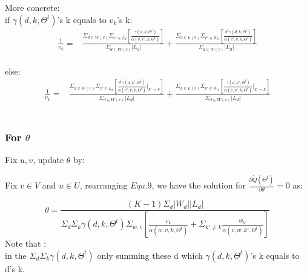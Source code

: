 \documentclass{article}
\begin{document}
More concrete:\\
if $\gamma(d,k,\Theta^t)$'s k equals to $v_k $'s k:
\begin{equation*}
\begin{aligned}
\frac{1}{v_k}= &\frac{\Sigma_{d\in W(v)}\Sigma_{v'\in L_d} [\frac{\gamma(d,k,\Theta^t)}{ \alpha(v,v',k,\Theta^t)} ]}{\Sigma_{d\in W(v)}|L_d|}+ \frac{\Sigma_{d\in L(v)}\Sigma_{v'\in W_d} [\frac{\theta^t \gamma(d,k,\Theta^t)}{\alpha(v',v,k,\Theta^t)}] }{\Sigma_{d\in W(v)}|L_d|}
\end{aligned}
\end{equation*}\\
else:
\begin{equation*}
\begin{aligned}
\frac{1}{v_k}= &\frac{\Sigma_{d\in W(v)}\Sigma_{v'\in L_d} [\frac{\theta^t\gamma(d,k',\Theta^t)}{\alpha(v',v,k,\Theta^t)}|_{k'=k}]}{\Sigma_{d\in W(v)}|L_d|}+\frac{\Sigma_{d\in L(v)}\Sigma_{v'\in W_d} [\frac{\gamma(d,k',\Theta^t)}{\alpha(v,v',k,\Theta^t)}|_{k'=k}] }{\Sigma_{d\in W(v)}|L_d|}
\end{aligned}
\end{equation*}\\

\subsubsection{For $\theta$}
Fix $u,v$, update $\theta$ by:

  Fix $v \in V$ and $u \in U$, rearranging $Equ.9$, we have the solution for $\frac{\partial \tilde{Q}(\Theta^t)}{\partial \theta}=0$ as:

 \begin{equation}
\theta = \frac{(K-1)\Sigma_d |W_d| |L_d|}{\Sigma_d \Sigma_k \gamma(d,k,\Theta^t) \Sigma_{w,v} [\frac{v_k}{\alpha(w,v,k,\Theta^t)}+\Sigma_{k'\neq k} \frac{w_{k'}}{\alpha(v,w,k',\Theta^t)}]}
 \end{equation}
Note that :\\
in the $\Sigma_d \Sigma_k \gamma(d,k,\Theta^t)$ only summing these d which $\gamma(d,k,\Theta^t)$'s k equals to d's k.
\end{document}
